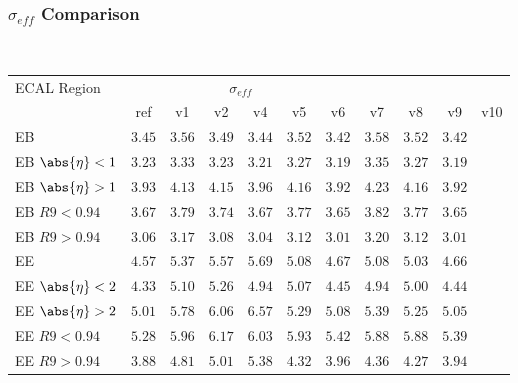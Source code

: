 \documentclass[8pt,serif]{beamer}
\begin{document}
\begin{frame}
  \frametitle{$ \sigma_{eff} $ Comparison}
\\


  
  \begin{center}
    \emph{\dataSample}\xspace \invMassVarName

\tiny \begin{tabular}{|l|c|c|c|c|c|c|c|c|c|c|} \hline  
ECAL Region & \multicolumn{6}{c|}{$\sigma_{eff}$} \\
            & ref  &  v1  & v2  &  v4  &  v5  & v6 & v7 & v8 & v9 & v10\\ 
\hline           
EB                  & $3.45$ & $3.56$ & $3.49$ & $3.44$ & $3.52$ & $3.42$ & $3.58$ & $3.52$ & $3.42$ \\
EB $\abs{\eta} < 1$ & $3.23$ & $3.33$ & $3.23$ & $3.21$ & $3.27$ & $3.19$ & $3.35$ & $3.27$ & $3.19$ \\
EB $\abs{\eta} > 1$ & $3.93$ & $4.13$ & $4.15$ & $3.96$ & $4.16$ & $3.92$ & $4.23$ & $4.16$ & $3.92$ \\
EB $R9 < 0.94$      & $3.67$ & $3.79$ & $3.74$ & $3.67$ & $3.77$ & $3.65$ & $3.82$ & $3.77$ & $3.65$ \\
EB $R9 > 0.94$      & $3.06$ & $3.17$ & $3.08$ & $3.04$ & $3.12$ & $3.01$ & $3.20$ & $3.12$ & $3.01$ \\
\hline
EE                  & $4.57$ & $5.37$ & $5.57$ & $5.69$ & $5.08$ & $4.67$ & $5.08$ & $5.03$ & $4.66$ \\
EE $\abs{\eta} < 2$ & $4.33$ & $5.10$ & $5.26$ & $4.94$ & $5.07$ & $4.45$ & $4.94$ & $5.00$ & $4.44$ \\
EE $\abs{\eta} > 2$ & $5.01$ & $5.78$ & $6.06$ & $6.57$ & $5.29$ & $5.08$ & $5.39$ & $5.25$ & $5.05$ \\
EE $R9 < 0.94$      & $5.28$ & $5.96$ & $6.17$ & $6.03$ & $5.93$ & $5.42$ & $5.88$ & $5.88$ & $5.39$ \\
EE $R9 > 0.94$      & $3.88$ & $4.81$ & $5.01$ & $5.38$ & $4.32$ & $3.96$ & $4.36$ & $4.27$ & $3.94$ \\
\hline  
\end{tabular} 
  \end{center}
\end{frame}
\end{document}
